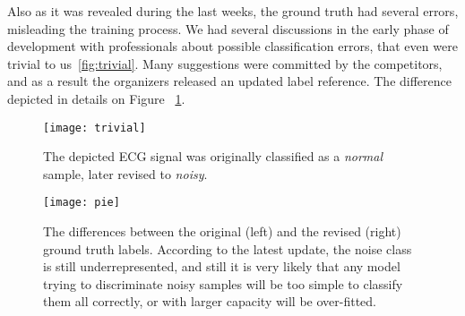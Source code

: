 Also as it was revealed during the last weeks, the ground truth had several errors, misleading the training process.
We had several discussions in the early phase of development with professionals about possible classification errors, that even were trivial to us~\ref{fig:trivial}. Many suggestions were committed by the competitors, and as a result the organizers released an updated label reference.
The difference depicted in details on Figure ~\ref{fig:pie}.
\begin{figure}[h!]
  \centering
  \texttt{[image: trivial]}
  \caption{The depicted ECG signal was originally classified as a \textit{normal} sample, later revised to \textit{noisy}.}
  \label{fig:trivial}
  \vspace*{\floatsep}

  \centering
  \texttt{[image: pie]}
  \caption{The differences between the original (left) and the revised (right) ground truth labels. According to the latest update, the noise class is still underrepresented, and still it is very likely that any model trying to discriminate noisy samples will be too simple to classify them all correctly, or with larger capacity will be over-fitted.}
  \label{fig:pie}
\end{figure}
